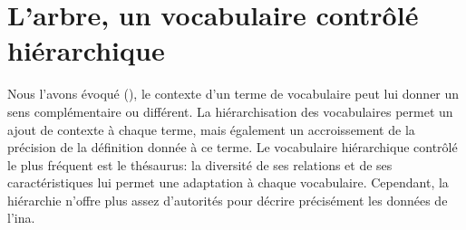 \chapter{\label{I-C}L'arbre, un vocabulaire contrôlé hiérarchique}

Nous l'avons évoqué (), le contexte d'un terme de vocabulaire peut lui donner un sens complémentaire ou différent. La hiérarchisation des vocabulaires permet un ajout de contexte à chaque terme, mais également un accroissement de la précision de la définition donnée à ce terme. Le vocabulaire hiérarchique contrôlé le plus fréquent est le thésaurus: la diversité de ses relations et de ses caractéristiques lui permet une adaptation à chaque vocabulaire. Cependant, la hiérarchie n'offre plus assez d'autorités pour décrire précisément les données de l'\ac{ina}.








